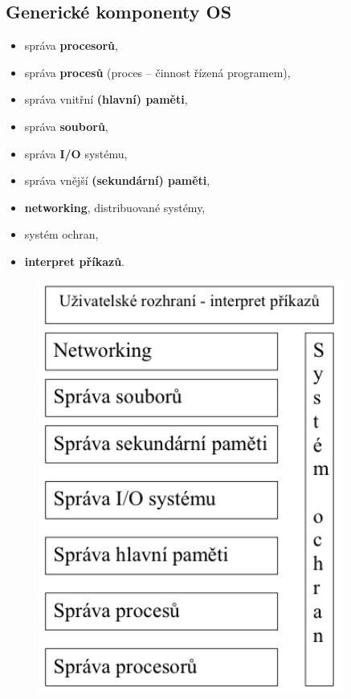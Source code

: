 \subsection{Generické komponenty OS} %
\begin{minipage}[t]{0.6\textwidth}
	\begin{itemize}
		\item správa \textbf{procesorů},
		\item správa \textbf{procesů} (proces – činnost řízená programem),
		\item správa vnitřní \textbf{(hlavní) paměti},
		\item správa \textbf{souborů},
		\item správa \textbf{I/O} systému,
		\item správa vnější \textbf{(sekundární) paměti},
		\item \textbf{networking}, distribuované systémy,
		\item systém ochran,
		\item \textbf{interpret příkazů}.
	\end{itemize}
\end{minipage}
\begin{minipage}[t]{0.38\textwidth}
	\vspace{-10mm}
	\begin{figure}[H]
		\centering
		\includegraphics[width=0.9\textwidth]{assets/3_gen_komp_os}
	\end{figure}
\end{minipage}

